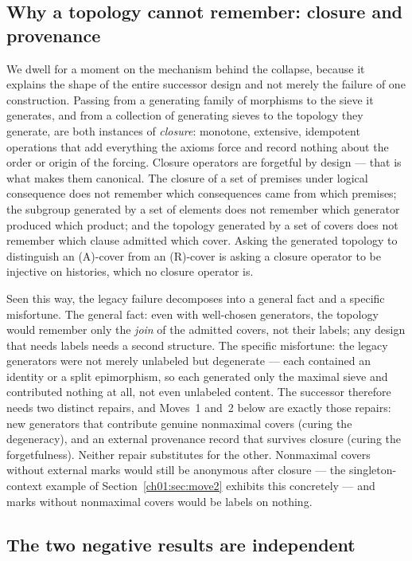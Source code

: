 \subsection{Why a topology cannot remember: closure and
provenance}\label{ch01:sec:closure}

We dwell for a moment on the mechanism behind the collapse,
because it explains the shape of the entire successor design and not merely
the failure of one construction. Passing from a generating family of
morphisms to the sieve it generates, and from a collection of generating
sieves to the topology they generate, are both instances of \emph{closure}:
monotone, extensive, idempotent operations that add everything the axioms
force and record nothing about the order or origin of the forcing. Closure
operators are forgetful by design --- that is what makes them canonical.
The closure of a set of premises under logical consequence does not
remember which consequences came from which premises; the subgroup
generated by a set of elements does not remember which generator produced
which product; and the topology generated by a set of covers does not
remember which clause admitted which cover. Asking the generated topology
to distinguish an (A)-cover from an (R)-cover is asking a closure operator
to be injective on histories, which no closure operator is.

Seen this way, the legacy failure decomposes into a general fact and a
specific misfortune. The general fact: even with well-chosen generators,
the topology would remember only the \emph{join} of the admitted covers,
not their labels; any design that needs labels needs a second structure.
The specific misfortune: the legacy generators were not merely unlabeled
but degenerate --- each contained an identity or a split epimorphism, so
each generated only the maximal sieve and contributed nothing at all, not
even unlabeled content. The successor therefore needs two distinct
repairs, and Moves~1 and~2 below are exactly those repairs: new generators
that contribute genuine nonmaximal covers (curing the degeneracy), and an
external provenance record that survives closure (curing the
forgetfulness). Neither repair substitutes for the other. Nonmaximal
covers without external marks would still be anonymous after closure ---
the singleton-context example of Section~\ref{ch01:sec:move2} exhibits
this concretely --- and marks without nonmaximal covers would be labels on
nothing.

\subsection{The two negative results are independent}\label{ch01:sec:independence}

